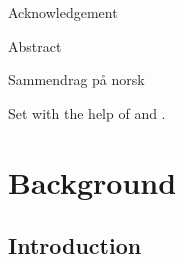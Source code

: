 \documentclass[11pt,bibliography=totoc,index=totoc]{scrbook}   %
\begin{document}
\frontmatter


Acknowledgement

Abstract

Sammendrag på norsk



Set with the help of {\LaTeXe} and {\KOMAScript}.


\tableofcontents

\mainmatter
\pagestyle{scrheadings}


%
\chapter{Background}\label{cha:Background} %
%

%
\section{Introduction}\label{sec:Intro}
%



\end{document}
